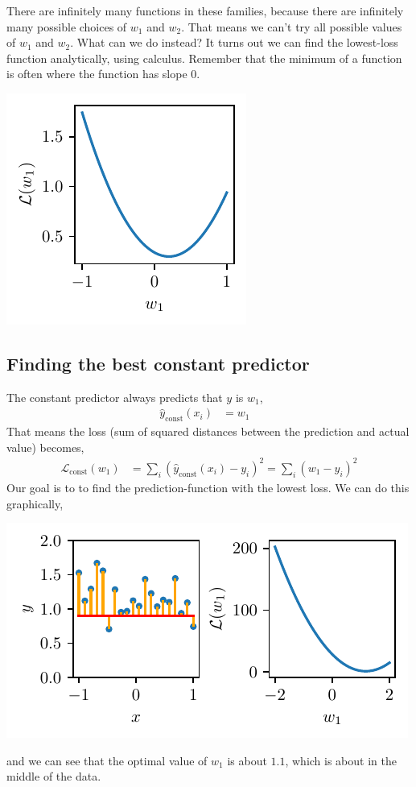 \documentclass{article}
\newcommand{\yh}{\hat{y}}
\newcommand{\bracket}[3]{\left#1 #3 \right#2}
\renewcommand{\b}{\bracket{(}{)}}
\renewcommand{\L}{\mathcal{L}}
\begin{document}
There are infinitely many functions in these families, because there are infinitely many possible choices of $w_1$ and $w_2$.
That means we can't try all possible values of $w_1$ and $w_2$.
What can we do instead?
It turns out we can find the lowest-loss function analytically, using calculus.
Remember that the minimum of a function is often where the function has slope $0$.
\begin{center}
  \includegraphics{x2.pdf}
\end{center}

\subsection{Finding the best constant predictor}
The constant predictor always predicts that $y$ is $w_1$,
\begin{align}
  \yh_\text{const}(x_i) &= w_1 & 
\end{align}
That means the loss (sum of squared distances between the prediction and actual value) becomes,
\begin{align}
  \L_\text{const}(w_1) &= \sum_i \b{\yh_\text{const}(x_i) - y_i}^2 =  \sum_i \b{w_1 - y_i}^2
\end{align} 
Our goal is to to find the prediction-function with the lowest loss.
We can do this graphically,
\begin{center}
  \includegraphics{const_obj.pdf}
\end{center}
and we can see that the optimal value of $w_1$ is about $1.1$, which is about in the middle of the data.
\end{document}
